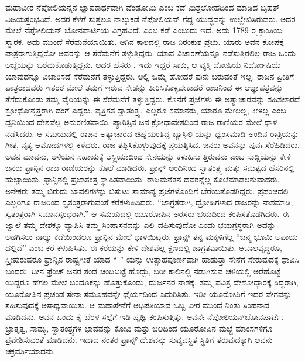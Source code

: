 ಮಹಾವೀರ ನೆಪೋಲಿಯನ್ನನ ಜ್ಞಾಪಕಾರ್ಥವಾಗಿ ವೆಂಡೋಮಿ ಎಂಬ ಕಡೆ ಮಿಶ್ರಲೋಹದಿಂದ ಮಾಡಿದ ಬೃಹತ್​ ವಿಜಯಸ್ತಂಭವಿದೆ. ಅದರ ಕೆಳಗೆ ಸುತ್ತಲೂ ನಾಲ್ಕುಕಡೆ ನೆಪೋಲಿಯನ್​ ಗೆದ್ದ ಯುದ್ಧವನ್ನು ಉಲ್ಲೇಖಿಸಿರುವರು. ಅದರ ಮೇಲೆ ನೆಪೋಲಿಯನ್​ ಬೋನಪಾರ್ಟಿಯ ವಿಗ್ರಹವಿದೆ.  ಎಂಬ ಕಡೆ  ಎಂಬುದು ಇದೆ. ಅದು 1789 ರ ಕ್ರಾಂತಿಯ ಸ್ಮಾರಕ. ಅದು ಮುಂದೆ ಸೆರೆಮನೆಯಾಯಿತು. ಆಗಿನ ಕಾಲದಲ್ಲಿ ರಾಜ ನಿರಂಕುಶ ಪ್ರಭು. ಯಾರು ಅವನ ಕೋಪಕ್ಕೆ ಪಾತ್ರರಾಗುತ್ತಿದ್ದರೋ ಅವರನ್ನು ಆ ಸೆರೆಮನೆಗೆ ತಳ್ಳುತ್ತಿದ್ದರು. ಯಾವ ವಿಚಾರಣೆಯನ್ನೂ ನಡೆಸುತ್ತಿರಲಿಲ್ಲ.ರಾಜ ಒಂದು ಆಜ್ಞೆಯನ್ನು ಬರೆದುಕೊಡುತ್ತಿದ್ದನು. ಅದರ ಹೆಸರು . ಇದು ಇದ್ದರೆ ಸಾಕು, ಆ ವ್ಯಕ್ತಿ ದೋಷಿಯೆ ನಿರ್ದೋಷಿಯೆ ಯಾವುದನ್ನೂ ವಿಚಾರಿಸದೆ ಸೆರೆಮನೆಗೆ ತಳ್ಳುತ್ತಿದ್ದರು. ಅಲ್ಲಿ ಒಮ್ಮೆ ಹೋದರೆ ಪುನಃ ಬರುವಂತೆ ಇಲ್ಲ. ರಾಜನ ಪ್ರೀತಿಗೆ ಪಾತ್ರರಾದವರು ಇತರರ ಮೇಲೆ ತಮಗೆ ಇರುವ ಸೇಡನ್ನು ತೀರಿಸಿಕೊಳ್ಳಬೇಕಾದರೆ ರಾಜನಿಂದ ಈ ಆಜ್ಞಾಪತ್ರವನ್ನು ತೆಗೆದುಕೊಂಡು ತಮ್ಮ ವೈರಿಯನ್ನು ಈ ಸೆರೆಮನೆಗೆ ತಳ್ಳುತ್ತಿದ್ದರು. ಕೊನೆಗೆ ಪ್ರಜೆಗಳು ಈ ಅತ್ಯಾಚಾರವನ್ನು ಸಹಿಸಲಾರದೆ ಕ್ರೋಧೋನ್ಮತ್ತರಾಗಿ ದಂಗೆ ಎದ್ದರು. ವ್ಯಕ್ತಿಗತ ಸ್ವಾತಂತ್ರ್ಯ, ಎಲ್ಲರೂ ಸಮಾನರು, ಯಾರೂ ಮೇಲಲ್ಲ, ಕೀಳಲ್ಲ ಎಂಬ ಧ್ವನಿಯಿಂದ ದೇಶವೆಲ್ಲ ಅನುರಣಿತವಾಯಿ. ಪ್ಯಾರಿಸ್ಸಿನ ಜನ ಕ್ರೋಧಾವೇಶದಿಂದ ರಾಜ ರಾಣಿಯರ ಮೇಲೆ ಧಾಳಿ ನಡೆಸಿದರು. ಆ ಸಮಯದಲ್ಲಿ ರಾಜನ ಅತ್ಯಾಚಾರದ ಚಿಹ್ನೆಯಂತಿದ್ದ ಬ್ಯಾಸ್ಟಿಲಿ ಯನ್ನು ಧ್ವಂಸಮಾಡಿ ಅಂದಿನ ರಾತ್ರಿಯನ್ನು ಗೀತ, ನೃತ್ಯ ಆಮೋದಗಳಲ್ಲಿ ಕಳೆದರು. ರಾಜ ತಪ್ಪಿಸಿಕೊಳ್ಳುವುದಕ್ಕೆ ಪ್ರಯತ್ನಿಸಿದ. ಜನರು ಅವನನ್ನು ಪುನಃ ಸೆರೆಹಿಡಿದರು. ಅವನ ಮಾವನು, ಅಳಿಯನ ಸಹಾಯಕ್ಕೆ ಆಸ್ಟ್ರಿಯಾದಿಂದ ಸೇನೆಯನ್ನು ಕಳುಹಿಸು ತ್ತಿರುವನು ಎಂಬ ಸುದ್ದಿಯನ್ನು ಕೇಳಿ ಜನರು ಫ್ರಾನ್ಸಿನ ರಾಜ ರಾಣಿಯರನ್ನು ಕೊಲೆ ಮಾಡಿದರು. ಫ್ರಾನ್ಸ್​ ಅಂದಿನಿಂದ ಸ್ವಾತಂತ್ರ್ಯ ಮತ್ತು ಸಮತ್ವದ ಹೆಸರಿನಲ್ಲಿ ಹುಚ್ಚಾಯಿತು. ಫ್ರಾನ್ಸಿನಲ್ಲಿ ಪ್ರಜಾತಂತ್ರ ಸ್ಥಾಪಿತವಾಯಿತು. ರಾಜಮನೆತನ ದವರನ್ನೆಲ್ಲ ಕೊಲೆಮಾಡಲನುವಾದರು. ಅನೇಕರು ತಮ್ಮ ಬಿರುದು ಬಾವಲಿಗಳನ್ನು ಬಿಸುಟು ಸಾಮಾನ್ಯ ಪ್ರಜೆಗಳೊಂದಿಗೆ ಬೆರೆಯತೊಡಗಿದ್ದರು. ಪ್ರಪಂಚದಲ್ಲಿ ಎಲ್ಲರಿಗೂ ರಾಜರಿಂದ ಸ್ವತಂತ್ರರಾಗುವಂತೆ ಕರೆಕಳುಹಿಸಿದರು. “ಜಾಗ್ರತರಾಗಿ, ದ್ರೋಹಿಗಳಾದ ರಾಜರನ್ನು ನಾಶಮಾಡಿ, ಸ್ವತಂತ್ರರಾಗಿ ಸಮಾನಸ್ಕಂಧರಾಗಿ.” ಆ ಸಮಯದಲ್ಲಿ ಯೂರೋಪಿನ ಅರಸರು ಭಯದಿಂದ ಕಂಪಿಸತೊಡಗಿದರು. ಈ ಜ್ವಾಲೆ ತಮ್ಮ ದೇಶಕ್ಕೂ ವ್ಯಾಪಿಸಿ ತಮ್ಮ ಸಿಂಹಾಸನವನ್ನು ಎಲ್ಲಿ ದಹಿಸುವುದೋ ಎಂದು ಭಯಗ್ರಸ್ಥರಾಗಿ ಅದನ್ನು ಅಡಗಿಸಲು ನಾಲ್ಕು ಕಡೆಯಿಂದಲೂ ಫ್ರಾನ್ಸಿನ ಮೇಲೆ ಧಾಳಿಯಿಟ್ಟರು. ಫ್ರಾನ್ಸ್​ ತನ್ನ ಮಕ್ಕಳಿಗೆಲ್ಲ “ಜನ್ಮ ಭೂಮಿ ಅಪಾಯ ದಲ್ಲಿದೆ” ಎಂಬ ಕರೆ ಕಳುಹಿಸಿತು. ಈ ಕರೆಯನ್ನು ಕೇಳಿ ದೇಶವೆಲ್ಲ ಕ್ಷಣದಲ್ಲಿ ಜಾಗ್ರತವಾಯಿತು. ಆಬಾಲವೃದ್ಧರೂ, ಸ್ತ್ರೀಪುರುಷರೂ ಫ್ರಾನ್ಸಿನ ರಾಷ್ಟ್ರಗೀತೆ ಯಾದ “ ” ಯನ್ನು ಉತ್ಸಾಹಪೂರ್ಣವಾಗಿ ಹಾಡುತ್ತಾ ಸೇನೆಗೆ ಸೇರುವುದಕ್ಕೆ ಧಾವಿಸಿ ಬಂದರು. ದೀನ ಫ್ರೆಂಚ್​ ಜನರ ತಂಡ ಚಿಂದಿಬಟ್ಟೆ ಹೊದ್ದು, ಬರೀ ಕಾಲಿನಲ್ಲಿ ನಡುಗಿಸುವ ಚಳಿಯಲ್ಲಿ ಅರೆಹೊಟ್ಟೆ ಯಿದ್ದರೂ ಹೆಗಲ ಮೇಲೆ ಬಂದೂಕನ್ನು ಹೊತ್ತುಕೊಂಡು, ದುರ್ಜನರ ನಾಶಕ್ಕೆ, ತಮ್ಮ ಪವಿತ್ರ ದೇಶೋದ್ಧಾರಕ್ಕೆ ಸಿದ್ಧರಾಗಿ, ಯೂರೋಪಿನ ಪ್ರಚಂಡ ಸೇನಾ ಸಮೂಹವನ್ನೇ ಧೈರ್ಯದಿಂದ ಎದುರಿಸಿತು. ಇಡೀ ಯೂರೋಪಿಗೆ ಇದರ ವೇಗವನ್ನು ಸಹಿಸುವುದಕ್ಕೆ ಅಸಾಧ್ಯವಾಯಿತು. ಆ ಮಹಾಸೇನೆಗೆ ಅಧಿಪತಿಯಾದ ಒಬ್ಬ ವೀರ ಮುಂದೆ ನಿಂತು ಸಿಂಹನಾದ ಮಾಡಿದನು. ಅವನ ಒಂದು ಕೈ ಬೆರಳ ಸಲ್ಲೆಗೆ ಇಡಿ ಪೃಥ್ವಿ ಕಂಪಿಸುತ್ತಿತ್ತು. ಅವನೇ ನೆಪೋಲಿಯನ್​ ಬೋನಪಾರ್ಟೆ. ಭ್ರಾತೃತ್ವ, ಸಾಮ್ಯ, ಸ್ವಾತಂತ್ರ್ಯಗಳ ಭಾವವನ್ನು ಕೋವಿ ಮತ್ತು ಬಲದಿಂದ ಯೂರೋಪಿನ ಮಜ್ಜೆ ಮಾಂಸಗಳಿಗೂ ಪ್ರವೇಶಿಸುವಂತೆ ಮಾಡಿದನು. ಇದಾದ ನಂತರ ಫ್ರಾನ್ಸ್​ ದೇಶವನ್ನು ಸುವ್ಯವಸ್ಥಿತ ಸ್ಥಿತಿಗೆ ತರುವುದಕ್ಕಾಗಿ ಅವನು ಚಕ್ರವರ್ತಿಯಾದನು.

